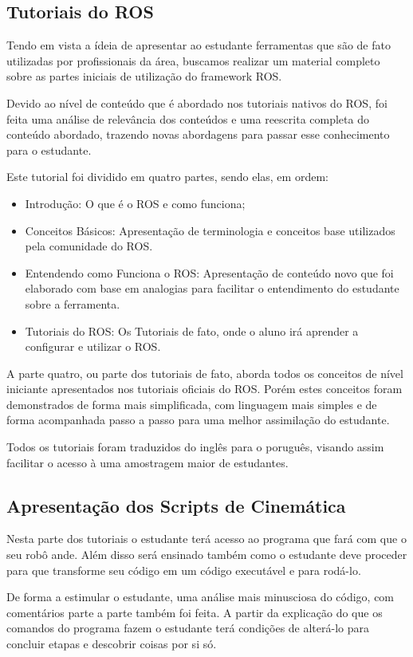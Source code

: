 \subsection{Tutoriais do ROS}
Tendo em vista a ídeia de apresentar ao estudante ferramentas que são de fato utilizadas por profissionais da área, buscamos realizar um material completo sobre as partes iniciais de utilização do framework ROS.

Devido ao nível de conteúdo que é abordado nos tutoriais nativos do ROS, foi feita uma análise de relevância dos conteúdos e uma reescrita completa do conteúdo abordado, trazendo novas abordagens para passar esse conhecimento para o estudante.

Este tutorial foi dividido em quatro partes, sendo elas, em ordem:
\begin{itemize}
	\item Introdução: O que é o ROS e como funciona;
	\item Conceitos Básicos: Apresentação de terminologia e conceitos base utilizados pela comunidade do ROS.
	\item Entendendo como Funciona o ROS: Apresentação de conteúdo novo que foi elaborado com base em analogias para facilitar o entendimento do estudante sobre a ferramenta.
	\item Tutoriais do ROS: Os Tutoriais de fato, onde o aluno irá aprender a configurar e utilizar o ROS.
\end{itemize}

A parte quatro, ou parte dos tutoriais de fato, aborda todos os conceitos de nível iniciante apresentados nos tutoriais oficiais do ROS. Porém estes conceitos foram demonstrados de forma mais simplificada, com linguagem mais simples e de forma acompanhada passo a passo para uma melhor assimilação do estudante.

Todos os tutoriais foram traduzidos do inglês para o poruguês, visando assim facilitar o acesso à uma amostragem maior de estudantes. \cite{tutROS}

\subsection{Apresentação dos Scripts de Cinemática}
Nesta parte dos tutoriais o estudante terá acesso ao programa que fará com que o seu robô ande. Além disso será ensinado também como o estudante deve proceder para que transforme seu código em um código executável e para rodá-lo.

De forma a estimular o estudante, uma análise mais minusciosa do código, com comentários parte a parte também foi feita. A partir da explicação do que os comandos do programa fazem o estudante terá condições de alterá-lo para concluir etapas e descobrir coisas por si só.

